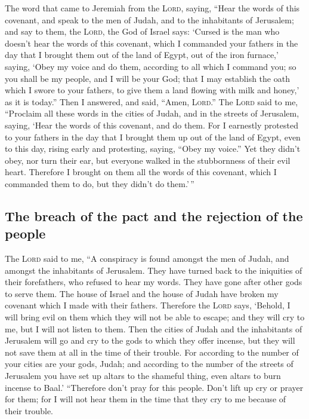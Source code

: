  The word that came to Jeremiah from the \textsc{Lord},
saying,  ``Hear the words of this covenant, and speak to
the men of Judah, and to the inhabitants of Jerusalem; 
and say to them, the \textsc{Lord}, the God of Israel says: `Cursed is
the man who doesn't hear the words of this covenant, 
which I commanded your fathers in the day that I brought them out of the
land of Egypt, out of the iron furnace,' saying, `Obey my voice and do
them, according to all which I command you; so you shall be my people,
and I will be your God;  that I may establish the oath
which I swore to your fathers, to give them a land flowing with milk and
honey,' as it is today.'' Then I answered, and said, ``Amen,
\textsc{Lord}.''  The \textsc{Lord} said to me, ``Proclaim
all these words in the cities of Judah, and in the streets of Jerusalem,
saying, `Hear the words of this covenant, and do them. 
For I earnestly protested to your fathers in the day that I brought them
up out of the land of Egypt, even to this day, rising early and
protesting, saying, ``Obey my voice.''  Yet they didn't
obey, nor turn their ear, but everyone walked in the stubbornness of
their evil heart. Therefore I brought on them all the words of this
covenant, which I commanded them to do, but they didn't do them.'\,''

\hypertarget{the-breach-of-the-pact-and-the-rejection-of-the-people}{%
\subsection{The breach of the pact and the rejection of the
people}\label{the-breach-of-the-pact-and-the-rejection-of-the-people}}

 The \textsc{Lord} said to me, ``A conspiracy is found
amongst the men of Judah, and amongst the inhabitants of Jerusalem.
 They have turned back to the iniquities of their
forefathers, who refused to hear my words. They have gone after other
gods to serve them. The house of Israel and the house of Judah have
broken my covenant which I made with their fathers. 
Therefore the \textsc{Lord} says, `Behold, I will bring evil on them
which they will not be able to escape; and they will cry to me, but I
will not listen to them.  Then the cities of Judah and
the inhabitants of Jerusalem will go and cry to the gods to which they
offer incense, but they will not save them at all in the time of their
trouble.  For according to the number of your cities are
your gods, Judah; and according to the number of the streets of
Jerusalem you have set up altars to the shameful thing, even altars to
burn incense to Baal.'  ``Therefore don't pray for this
people. Don't lift up cry or prayer for them; for I will not hear them
in the time that they cry to me because of their trouble.

